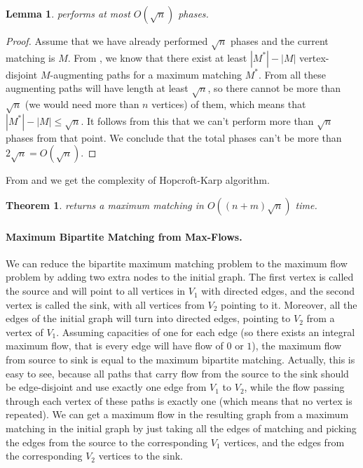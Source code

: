 \documentclass[12pt]{report}
\newtheorem{llemma}[base]{Lemma}
\newtheorem{ttheorem}[base]{Theorem}
\numberwithin{algorithm}{chapter}
\begin{document}
	\begin{llemma} \label{HKTotalPhases}
		 performs at most $O(\sqrt{n})$ phases.
	\end{llemma}
	\begin{proof}
		Assume that we have already performed $\sqrt{n}$ phases and the current matching is $M$. From , we know that there exist at least $|M^{*}| - |M|$ vertex-disjoint $M$-augmenting paths for a maximum matching $M^{*}$.
		From  all these augmenting paths will have length at least $\sqrt{n}$, so there cannot be more than $\sqrt{n}$ (we would need more than $n$ vertices) of them, which means that $|M^{*}| - |M| \leq \sqrt{n}$. It follows from this that we can't perform more than $\sqrt{n}$ phases from that point. We conclude that the total phases can't be more than $2\sqrt{n} = O(\sqrt{n})$.
	\end{proof}
	
	From  and  we get the complexity of Hopcroft-Karp algorithm.
	
	\begin{ttheorem}
		 returns a maximum matching in $O((n+m)\sqrt{n})$ time.
	\end{ttheorem}

	\paragraph{Maximum Bipartite Matching from Max-Flows.} We can reduce the bipartite maximum matching problem to the maximum flow problem by adding two extra nodes to the initial graph. The first vertex is called the source and will point to all vertices in $V_{1}$ with directed edges, and the second vertex is called the sink, with all vertices from $V_{2}$ pointing to it. Moreover, all the edges of the initial graph will turn into directed edges, pointing to $V_{2}$ from a vertex of $V_{1}$. Assuming capacities of one for each edge (so there exists an integral maximum flow, that is every edge will have flow of $0$ or $1$), the maximum flow from source to sink is equal to the maximum bipartite matching. Actually, this is easy to see, because all paths that carry flow from the source to the sink should be edge-disjoint and use exactly one edge from $V_{1}$ to $V_{2}$, while the flow passing through each vertex of these paths is exactly one (which means that no vertex is repeated). We can get a maximum flow in the resulting graph from a maximum matching in the initial graph by just taking all the edges of matching and picking the edges from the source to the corresponding $V_{1}$ vertices, and the edges from the corresponding $V_{2}$ vertices to the sink.
	
\end{document}
